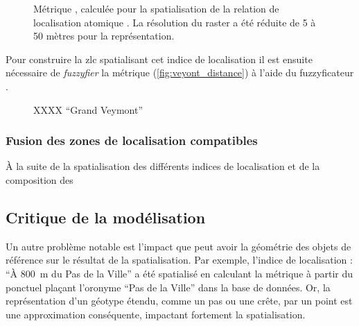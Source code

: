\begin{figure}
  \centering
  
  \caption{Métrique \protect{}, calculée pour la
    spatialisation de la relation de localisation atomique
    \protect{}. La résolution
    du raster a été réduite de 5 à 50 mètres pour la représentation.}
  \label{fig:veyont_distance}
\end{figure}

Pour construire la \ac{zlc} spatialisant cet indice de localisation il
est ensuite nécessaire de \emph{fuzzyfier} la métrique
(\autoref{fig:veyont_distance}) à l'aide du fuzzyficateur
.

\begin{figure}
  \centering
  
  \caption{XXXX \enquote{Grand Veymont}}
  \label{fig:fuzzy_veyont_distance}
\end{figure}




\subsubsection{Fusion des zones de localisation compatibles}

À la suite de la spatialisation des différents indices de localisation
et de la composition des 

\subsection{Critique de la modélisation}
\label{subsec:9-2-3}


Un autre problème notable est l'impact que peut avoir la géométrie des
objets de référence sur le résultat de la spatialisation. Par exemple,
l'indice de localisation : \enquote{À \SI{800}{\meter} du Pas de la
  Ville} a été spatialisé en calculant la métrique
 à partir du ponctuel plaçant l'oronyme
\enquote{Pas de la Ville} dans la base de données. Or, la
représentation d'un géotype étendu, comme un pas ou une crête, par un
point est une approximation conséquente, impactant fortement la
spatialisation.


